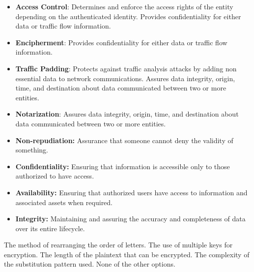 \begin{solution}
    \begin{itemize}
        \item \textbf{Access Control}: Determines and enforce the access rights of the entity depending on the authenticated identity. Provides confidentiality for either data or traffic flow information.
        \item \textbf{Encipherment}: Provides confidentiality for either data or traffic flow information.
        \item \textbf{Traffic Padding}: Protects against traffic analysis attacks by adding non essential data to network communications. Assures data integrity, origin, time, and destination about data communicated between two or more entities.
        \item \textbf{Notarization}: Assures data integrity, origin, time, and destination about data communicated between two or more entities.
    \end{itemize}
\end{solution}

\begin{solution}
    \begin{itemize}
        \item \textbf{Non-repudiation:} Assurance that someone cannot deny the validity of something.
        \item \textbf{Confidentiality:} Ensuring that information is accessible only to those authorized to have access.
        \item \textbf{Availability:} Ensuring that authorized users have access to information and associated assets when required.
        \item \textbf{Integrity:} Maintaining and assuring the accuracy and completeness of data over its entire lifecycle.
    \end{itemize}
\end{solution}

\begin{checkboxes}
    \choice The method of rearranging the order of letters.
    \choice The use of multiple keys for encryption.
    \choice The length of the plaintext that can be encrypted.
    \CorrectChoice The complexity of the substitution pattern used.
    \choice None of the other options.
\end{checkboxes}

